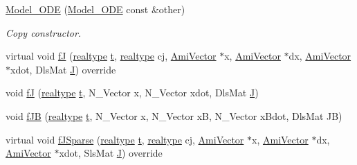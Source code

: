 \begin{DoxyCompactItemize}
\item 
\mbox{\hyperlink{classamici_1_1_model___o_d_e_a3dd56b20bce94d235d70817c338e2ca0}{Model\+\_\+\+O\+DE}} (\mbox{\hyperlink{classamici_1_1_model___o_d_e}{Model\+\_\+\+O\+DE}} const \&other)
\begin{DoxyCompactList}\small\item\em Copy constructor. \end{DoxyCompactList}\item 
virtual void \mbox{\hyperlink{classamici_1_1_model___o_d_e_a99337eaeac6c70528c3464affe13df2e}{fJ}} (\mbox{\hyperlink{namespaceamici_a1bdce28051d6a53868f7ccbf5f2c14a3}{realtype}} \mbox{\hyperlink{classamici_1_1_model_a711281d57e9710226face29151cc4641}{t}}, \mbox{\hyperlink{namespaceamici_a1bdce28051d6a53868f7ccbf5f2c14a3}{realtype}} cj, \mbox{\hyperlink{classamici_1_1_ami_vector}{Ami\+Vector}} $\ast$x, \mbox{\hyperlink{classamici_1_1_ami_vector}{Ami\+Vector}} $\ast$dx, \mbox{\hyperlink{classamici_1_1_ami_vector}{Ami\+Vector}} $\ast$xdot, Dls\+Mat \mbox{\hyperlink{classamici_1_1_model_a71cc1d93543998249a172328e1a4dbcd}{J}}) override
\item 
void \mbox{\hyperlink{classamici_1_1_model___o_d_e_aa2c40d6808a333eee2a96e6737d85161}{fJ}} (\mbox{\hyperlink{namespaceamici_a1bdce28051d6a53868f7ccbf5f2c14a3}{realtype}} \mbox{\hyperlink{classamici_1_1_model_a711281d57e9710226face29151cc4641}{t}}, N\+\_\+\+Vector x, N\+\_\+\+Vector xdot, Dls\+Mat \mbox{\hyperlink{classamici_1_1_model_a71cc1d93543998249a172328e1a4dbcd}{J}})
\item 
void \mbox{\hyperlink{classamici_1_1_model___o_d_e_acab6095aacecc64e1a67e984af2475f8}{f\+JB}} (\mbox{\hyperlink{namespaceamici_a1bdce28051d6a53868f7ccbf5f2c14a3}{realtype}} \mbox{\hyperlink{classamici_1_1_model_a711281d57e9710226face29151cc4641}{t}}, N\+\_\+\+Vector x, N\+\_\+\+Vector xB, N\+\_\+\+Vector x\+Bdot, Dls\+Mat JB)
\item 
virtual void \mbox{\hyperlink{classamici_1_1_model___o_d_e_a3147c7a327fead438efe714f04491c82}{f\+J\+Sparse}} (\mbox{\hyperlink{namespaceamici_a1bdce28051d6a53868f7ccbf5f2c14a3}{realtype}} \mbox{\hyperlink{classamici_1_1_model_a711281d57e9710226face29151cc4641}{t}}, \mbox{\hyperlink{namespaceamici_a1bdce28051d6a53868f7ccbf5f2c14a3}{realtype}} cj, \mbox{\hyperlink{classamici_1_1_ami_vector}{Ami\+Vector}} $\ast$x, \mbox{\hyperlink{classamici_1_1_ami_vector}{Ami\+Vector}} $\ast$dx, \mbox{\hyperlink{classamici_1_1_ami_vector}{Ami\+Vector}} $\ast$xdot, Sls\+Mat \mbox{\hyperlink{classamici_1_1_model_a71cc1d93543998249a172328e1a4dbcd}{J}}) override

\end{DoxyCompactItemize}
